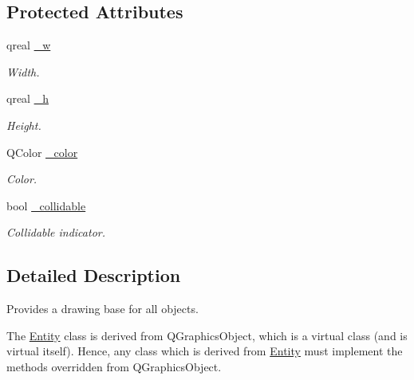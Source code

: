 \subsection*{Protected Attributes}
\begin{DoxyCompactItemize}
\item 
\mbox{\label{class_entity_aa4f8b6919e9646c8dd33013ed585caf9}} 
qreal \hyperlink{class_entity_aa4f8b6919e9646c8dd33013ed585caf9}{\+\_\+w}
\begin{DoxyCompactList}\small\item\em Width. \end{DoxyCompactList}\item 
\mbox{\label{class_entity_ac84e203caccde9a0b9e77a3f6faf9f72}} 
qreal \hyperlink{class_entity_ac84e203caccde9a0b9e77a3f6faf9f72}{\+\_\+h}
\begin{DoxyCompactList}\small\item\em Height. \end{DoxyCompactList}\item 
\mbox{\label{class_entity_a310d0e5d3f4283ce280b568035a6ea2a}} 
Q\+Color \hyperlink{class_entity_a310d0e5d3f4283ce280b568035a6ea2a}{\+\_\+color}
\begin{DoxyCompactList}\small\item\em Color. \end{DoxyCompactList}\item 
\mbox{\label{class_entity_a7175301bfaa1a27b247ee40e7ba177e5}} 
bool \hyperlink{class_entity_a7175301bfaa1a27b247ee40e7ba177e5}{\+\_\+collidable}
\begin{DoxyCompactList}\small\item\em Collidable indicator. \end{DoxyCompactList}\end{DoxyCompactItemize}


\subsection{Detailed Description}
Provides a drawing base for all objects. 

The \hyperlink{class_entity}{Entity} class is derived from Q\+Graphics\+Object, which is a virtual class (and is virtual itself). Hence, any class which is derived from \hyperlink{class_entity}{Entity} must implement the methods overridden from Q\+Graphics\+Object. 

